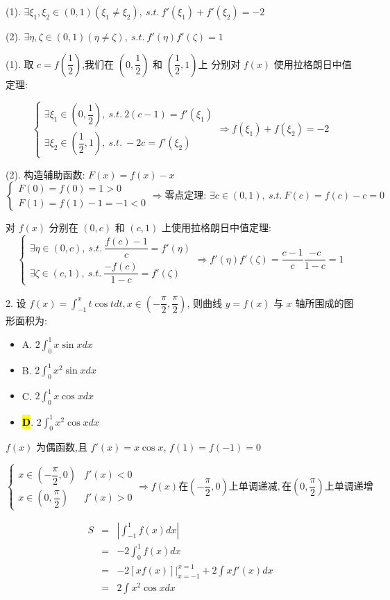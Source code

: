 (1). $\exists \xi_{1},\xi_{2}\in(0,1)(\xi_{1}\neq \xi_{2}),\ s.t.\ f'(\xi_{1})+f'(\xi_{2})=-2$

(2). $\exists \eta,\zeta\in(0,1)(\eta\neq \zeta),\ s.t.\ f'(\eta)f'(\zeta)=1$
\begin{solution}

	(1). 取 $c=f(\dfrac{1}{2})$,我们在 $(0,\dfrac{1}{2})$ 和 $(\dfrac{1}{2},1)$上
	分别对 $f(x)$ 使用拉格朗日中值定理:  
	
	$$\begin{cases}
		\exists \xi_{1}\in(0,\dfrac{1}{2}),\ s.t.\ 2(c-1) = f'(\xi_{1}) \\
		\exists \xi_{2}\in(\dfrac{1}{2},1),\ s.t.\ -2c = f'(\xi_{2})
	\end{cases}
	\Rightarrow f(\xi_{1})+f(\xi_{2})=-2$$
	
	(2). 构造辅助函数: $F(x)=f(x)-x$  
	$$\begin{cases}
		F(0) = f(0) = 1 > 0 \\
		F(1) = f(1) - 1 = -1 < 0
	\end{cases}\Rightarrow \text{零点定理: }
	\exists c\in(0,1),\ s.t.\ F(c) = f(c) - c = 0$$
	
	对 $f(x)$ 分别在 $(0,c)$ 和 $(c,1)$ 上使用拉格朗日中值定理:  
	$$\begin{cases}
		\exists\eta\in(0,c),\ s.t.\ \dfrac{f(c)-1}{c} = f'(\eta)\\
		\exists\zeta\in(c,1),\ s.t.\ \dfrac{-f(c)}{1-c} = f'(\zeta)
	\end{cases}\Rightarrow 
	f'(\eta)f'(\zeta) = \dfrac{c-1}{c}\dfrac{-c}{1-c} = 1$$
\end{solution}

2. 设 $\displaystyle{f(x)=\int_{-1}^{x}t\cos tdt,x\in(-\dfrac{\pi}{2},\dfrac{\pi}{2})}$,
则曲线 $y=f(x)$ 与 $x$ 轴所围成的图形面积为:  
\begin{itemize}
	\item A. $2\int_{0}^{1}x\sin xdx$
	\item B. $2\int_{0}^{1}x^2\sin xdx$
	\item C. $2\int_{0}^{1}x\cos xdx$
	\item \hl{\textbf{D}}. $2\int_{0}^{1}x^2\cos xdx$
\end{itemize}
\begin{solution}

	$f(x)$ 为偶函数,且 $f'(x)=x\cos x$, $f(1)=f(-1)=0$  

	$$\begin{cases}
		x\in(-\dfrac{\pi}{2},0) & f'(x)<0\\
		x\in(0,\dfrac{\pi}{2}) & f'(x)>0
	\end{cases}\Rightarrow
	 f(x) \text{在}(-\dfrac{\pi}{2},0)\text{上单调递减},
	 \text{在}(0,\dfrac{\pi}{2})\text{上单调递增}$$
	
	\begin{eqnarray*}
		S & = & |\int_{-1}^{1}f(x)dx|\\
		  & = & -2\int_{0}^{1}f(x)dx\\
		  & = & -2[xf(x)]\big|_{x=-1}^{x=1} + 2\int xf'(x)dx\\
		  & = & 2\int x^{2}\cos xdx
	\end{eqnarray*}
\end{solution}

